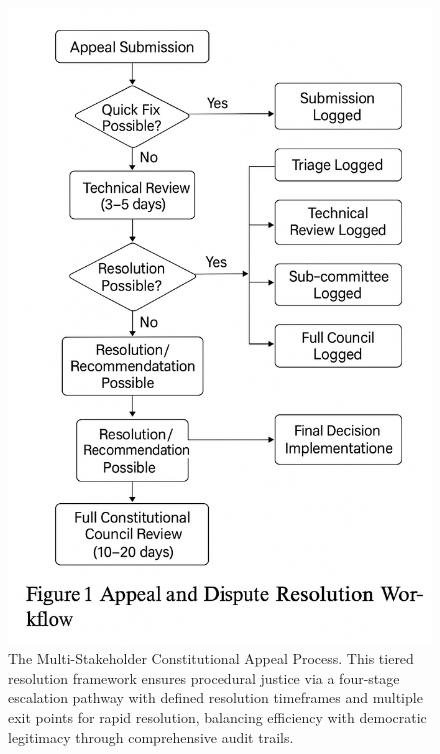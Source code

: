 \documentclass[manuscript,screen,review,anonymous,9pt]{acmart}
\begin{document}
\begin{figure}[htbp]
\centering
\includegraphics[width=\linewidth,keepaspectratio]{figs/Figure_1_Appeal_and_Dispute_Resolution_Workflow.png}
\caption[Multi-Stakeholder Constitutional Appeal Process]{The Multi-Stakeholder Constitutional Appeal Process. This tiered resolution framework ensures procedural justice via a four-stage escalation pathway with defined resolution timeframes and multiple exit points for rapid resolution, balancing efficiency with democratic legitimacy through comprehensive audit trails.}
\label{fig:appeal_workflow}
\end{figure}
\end{document}
